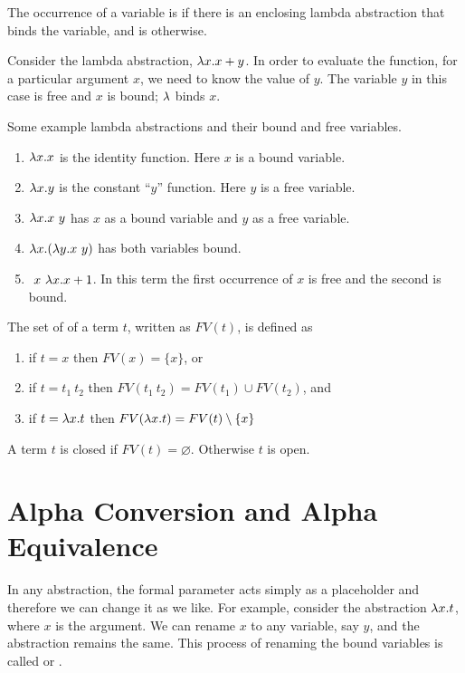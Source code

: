\begin{definition}
The occurrence of a variable is  if there is an enclosing
lambda abstraction that binds the variable, and is 
otherwise.
\end{definition}

\begin{example}
Consider the lambda abstraction, $\lambda x. x + y$.  In order to evaluate
the function, for a particular argument $x$, we need to know
the value of $y$.  The variable $y$ in this case is free and $x$
is bound; $\lambda$ binds $x$.  
\end{example}


\begin{example} 
  Some example lambda abstractions and their bound and free variables.
\begin{enumerate}
\item $\lambda x. x$ is the identity function. Here $x$ is a bound variable.
\item $\lambda x. y$ is the constant ``$y$'' function. Here $y$ is a free variable.
\item $\lambda x. x~y$ has $x$ as a bound variable and $y$ as a free variable.
\item $\lambda x. (\lambda y. x~y)$ has both variables bound.
\item $~x~\lambda x. x + 1$.  In this term the first occurrence of $x$ is
  free and the second is bound.
\end{enumerate}
\end{example}


\begin{definition}
\label{def:FV}
The set of  of a term $t$, written as $FV(t)$,
is defined as 
\begin{enumerate}
\item if $t = x$ then $FV(x) = \{ x \}$, or
\item if $t = t_1~t_2$ then $FV(t_1~t_2)=FV(t_1) \cup FV(t_2)$, and
\item if $t = \lambda x. t$ then $FV(\lambda x.t)=FV(t) \setminus \{x\}$
\end{enumerate}
\end{definition}

\begin{definition}
A term $t$ is closed if $FV(t) = \varnothing$. Otherwise $t$ is open. 
\end{definition}


\section{Alpha Conversion and Alpha Equivalence}
In any abstraction, the formal parameter acts simply as a placeholder and therefore we can change it as we like.
%
For example, consider the abstraction $\lambda x.t$, where $x$ is the argument. We can rename $x$ to any variable, say $y$, and the abstraction remains the same.
%  
This process of renaming the bound variables is called
 or .  
%

